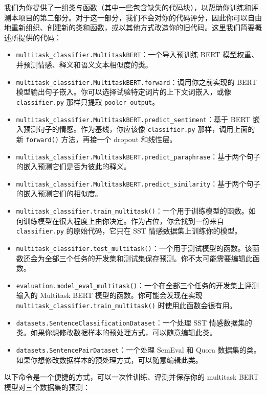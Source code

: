 \documentclass[11pt]{article}
\begin{document}
我们为你提供了一组类与函数（其中一些包含缺失的代码块），以帮助你训练和评测本项目的第二部分。对于这一部分，我们不会对你的代码评分，因此你可以自由地重新组织、创建新的类和函数，或以其他方式改造你的旧代码。这里我们简要概述所提供的代码：

\begin{itemize}[leftmargin=1.5em]
  \item \texttt{multitask\_classifier.MultitaskBERT}：一个导入预训练 BERT 模型权重、并预测情感、释义和语义文本相似度的类。
  \item \texttt{multitask\_classifier.MultitaskBERT.forward}：调用你之前实现的 BERT 模型输出句子嵌入。你可以选择试验特定词片的上下文词嵌入，或像 \texttt{classifier.py} 那样只提取 \texttt{pooler\_output}。
  \item \texttt{multitask\_classifier.MultitaskBERT.predict\_sentiment}：基于 BERT 嵌入预测句子的情感。作为基线，你应该像 \texttt{classifier.py} 那样，调用上面的新 \texttt{forward()} 方法，再接一个 dropout 和线性层。
  \item \texttt{multitask\_classifier.MultitaskBERT.predict\_paraphrase}：基于两个句子的嵌入预测它们是否为彼此的释义。
  \item \texttt{multitask\_classifier.MultitaskBERT.predict\_similarity}：基于两个句子的嵌入预测它们的相似度。
  \item \texttt{multitask\_classifier.train\_multitask()}：一个用于训练模型的函数。如何训练模型在很大程度上由你决定。作为占位，你会找到一份来自 \texttt{classifier.py} 的原始代码，它只在 SST 情感数据集上训练你的模型。
  \item \texttt{multitask\_classifier.test\_multitask()}：一个用于测试模型的函数。该函数还会为全部三个任务的开发集和测试集保存预测。你不太可能需要编辑此函数。
  \item \texttt{evaluation.model\_eval\_multitask()}：一个在全部三个任务的开发集上评测输入的 Multitask BERT 模型的函数。你可能会发现在实现 \texttt{multitask\_classifier.train\_multitask()} 时使用此函数会很有用。
  \item \texttt{datasets.SentenceClassificationDataset}：一个处理 SST 情感数据集的类。如果你想修改数据样本的预处理方式，可以随意编辑此类。
  \item \texttt{datasets.SentencePairDataset}：一个处理 SemEval 和 Quora 数据集的类。如果你想修改数据样本的预处理方式，可以随意编辑此类。
\end{itemize}

以下命令是一个便捷的方式，可以一次性训练、评测并保存你的 multitask BERT 模型对三个数据集的预测：
\end{document}
